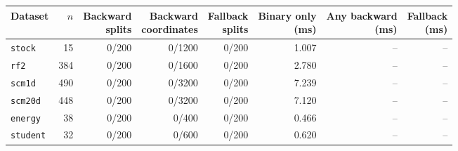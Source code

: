 \begin{tabular}{lrrrrrrr}
\toprule
Dataset & $n$ & \shortstack{Backward\\splits} & \shortstack{Backward\\coordinates} & \shortstack{Fallback\\splits} & \shortstack{Binary only\\(ms)} & \shortstack{Any backward\\(ms)} & \shortstack{Fallback\\(ms)} \\
\midrule
\texttt{stock} & 15 & 0/200 & 0/1200 & 0/200 & 1.007 & -- & -- \\
\texttt{rf2} & 384 & 0/200 & 0/1600 & 0/200 & 2.780 & -- & -- \\
\texttt{scm1d} & 490 & 0/200 & 0/3200 & 0/200 & 7.239 & -- & -- \\
\texttt{scm20d} & 448 & 0/200 & 0/3200 & 0/200 & 7.120 & -- & -- \\
\texttt{energy} & 38 & 0/200 & 0/400 & 0/200 & 0.466 & -- & -- \\
\texttt{student} & 32 & 0/200 & 0/600 & 0/200 & 0.620 & -- & -- \\
\bottomrule
\end{tabular}
